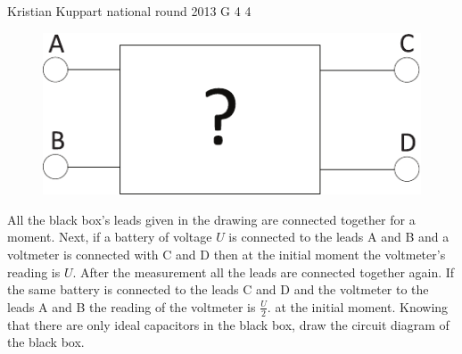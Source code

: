 \documentclass[11pt]{article}
\begin{document}
{Kristian Kuppart} %
{national round} %
{2013} %
{G 4} %
{4} %
{

\ifEngStatement
\begin{figure}%
\includegraphics[width=\linewidth]{2013-v3g-04-pilt1}%
\end{figure}
All the black box’s leads given in the drawing are connected together for a moment. Next, if a battery of voltage $U$ is connected to the leads A and B and a voltmeter is connected with C and D then at the initial moment the voltmeter’s reading is $U$. After the measurement all the leads are connected together again. If the same battery is connected to the leads C and D and the voltmeter to the leads A and B the reading of the voltmeter is $\frac{U}{2}.$ at the initial moment. Knowing that there are only ideal capacitors in the black box, draw the circuit diagram of the black box.
\fi
}
\end{document}
